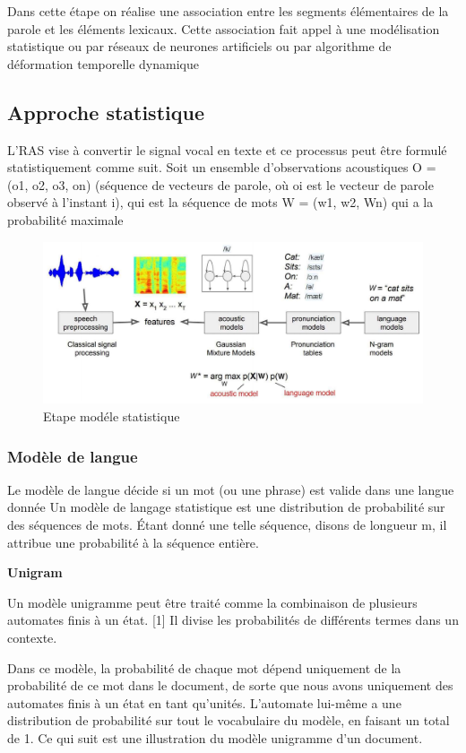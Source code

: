 \documentclass[a4paper, 12pt]{book}
\begin{document}
Dans cette étape on réalise une association entre les segments élémentaires de la parole et les éléments lexicaux. Cette association fait appel à une modélisation statistique ou par réseaux de neurones artificiels ou par algorithme de déformation temporelle dynamique

\subsection{Approche statistique}

L'RAS vise à convertir le signal vocal en texte et ce processus peut être formulé statistiquement comme suit. Soit un ensemble d'observations acoustiques O = (o1, o2, o3, on) (séquence de vecteurs de parole, où oi est le vecteur de parole observé à l'instant i), qui est la séquence de mots W = (w1, w2, Wn) qui a la probabilité maximale


\begin{figure}[htbp]
  \centering
  \includegraphics[width=1\linewidth]{fig/model.png}
  \caption{Etape modéle statistique}
\end{figure}

\subsubsection{Modèle de langue}

Le modèle de langue décide si un mot (ou une phrase) est valide dans une langue donnée Un modèle de langage statistique est une distribution de probabilité sur des séquences de mots. Étant donné une telle séquence, disons de longueur m, il attribue une probabilité à la séquence entière.

\textbf{Unigram}

Un modèle unigramme peut être traité comme la combinaison de plusieurs automates finis à un état. [1] Il divise les probabilités de différents termes dans un contexte.

Dans ce modèle, la probabilité de chaque mot dépend uniquement de la probabilité de ce mot dans le document, de sorte que nous avons uniquement des automates finis à un état en tant qu'unités. L'automate lui-même a une distribution de probabilité sur tout le vocabulaire du modèle, en faisant un total de 1. Ce qui suit est une illustration du modèle unigramme d'un document.
\end{document}
